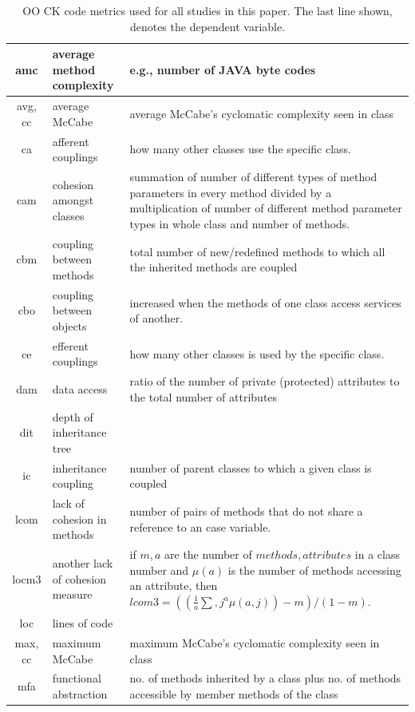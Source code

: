 \documentclass[sigconf]{acmart}
\theoremstyle{break}
\begin{document}
 \begin{table}[!t]
\renewcommand{\baselinestretch}{0.8}\begin{center}
\caption{OO CK code metrics used for all studies in this paper.
The last line shown, denotes the dependent variable.}
\label{fig:ck}
{\footnotesize
\begin{tabular}{c|l|p{4.4in}}
amc & average method complexity & e.g., number of JAVA byte codes\\
\hline
avg, cc & average McCabe & average McCabe's cyclomatic complexity seen
in class\\
\hline
ca & afferent couplings & how many other classes use the specific
class. \\
\hline
cam & cohesion amongst classes & summation of number of different
types of method parameters in every method divided by a multiplication
of number of different method parameter types in whole class and
number of methods. \\
\hline
cbm &coupling between methods & total number of new/redefined methods
to which all the inherited methods are coupled\\
\hline
cbo & coupling between objects & increased when the methods of one
class access services of another.\\
\hline
ce & efferent couplings & how many other classes is used by the
specific class. \\
\hline
dam & data access & ratio of the number of private (protected)
attributes to the total number of attributes\\
\hline
dit & depth of inheritance tree &\\
\hline
ic & inheritance coupling & number of parent classes to which a given
class is coupled
\\
\hline
lcom & lack of cohesion in methods &number of pairs of methods that do
not share a reference to an case variable.\\
\hline
locm3 & another lack of cohesion measure & if $m,a$ are the number of
$methods,attributes$
in a class number and $\mu(a)$ is the number of methods accessing an
attribute,
then
$lcom3=((\frac{1}{a} \sum, j^a \mu(a, j)) - m)/ (1-m)$.
\\
\hline
loc & lines of code &\\
\hline
max, cc & maximum McCabe & maximum McCabe's cyclomatic complexity seen
in class\\
\hline
mfa & functional abstraction & no. of methods inherited by a class
plus no. of methods accessible by member methods of the
class\\

\end{tabular}}
\end{center}
\end{table}
\end{document}
